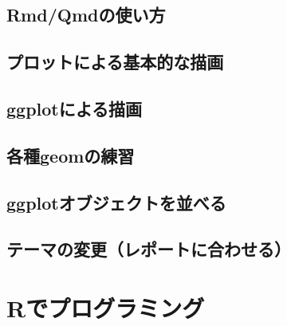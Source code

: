 \documentclass[
  a4paper,
]{ltjsbook}
\begin{document}
\hypertarget{rmdqmdux306eux4f7fux3044ux65b9}{%
\section{Rmd/Qmdの使い方}\label{rmdqmdux306eux4f7fux3044ux65b9}}

\hypertarget{ux30d7ux30edux30c3ux30c8ux306bux3088ux308bux57faux672cux7684ux306aux63cfux753b}{%
\section{プロットによる基本的な描画}\label{ux30d7ux30edux30c3ux30c8ux306bux3088ux308bux57faux672cux7684ux306aux63cfux753b}}

\hypertarget{ggplotux306bux3088ux308bux63cfux753b}{%
\section{ggplotによる描画}\label{ggplotux306bux3088ux308bux63cfux753b}}

\hypertarget{ux5404ux7a2egeomux306eux7df4ux7fd2}{%
\section{各種geomの練習}\label{ux5404ux7a2egeomux306eux7df4ux7fd2}}

\hypertarget{ggplotux30aaux30d6ux30b8ux30a7ux30afux30c8ux3092ux4e26ux3079ux308b}{%
\section{ggplotオブジェクトを並べる}\label{ggplotux30aaux30d6ux30b8ux30a7ux30afux30c8ux3092ux4e26ux3079ux308b}}

\hypertarget{ux30c6ux30fcux30deux306eux5909ux66f4ux30ecux30ddux30fcux30c8ux306bux5408ux308fux305bux308b}{%
\section{テーマの変更（レポートに合わせる）}\label{ux30c6ux30fcux30deux306eux5909ux66f4ux30ecux30ddux30fcux30c8ux306bux5408ux308fux305bux308b}}


\hypertarget{rux3067ux30d7ux30edux30b0ux30e9ux30dfux30f3ux30b0}{%
\chapter{Rでプログラミング}\label{rux3067ux30d7ux30edux30b0ux30e9ux30dfux30f3ux30b0}}
\end{document}
